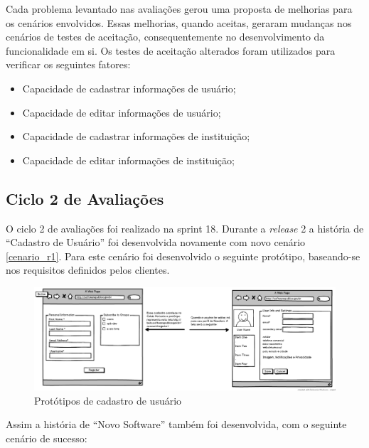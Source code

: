 Cada problema levantado nas avaliações gerou uma proposta de melhorias para os cenários envolvidos. Essas melhorias, quando aceitas, geraram mudanças nos cenários de testes de aceitação, consequentemente no desenvolvimento da funcionalidade em si. Os testes de aceitação alterados foram utilizados para verificar os seguintes fatores:

\begin{itemize}
	\item Capacidade de cadastrar informações de usuário;
	\item Capacidade de editar informações de usuário;
	\item Capacidade de cadastrar informações de instituição;
	\item Capacidade de editar informações de instituição;
\end{itemize}

\subsection{Ciclo 2 de Avaliações}

O ciclo 2 de avaliações foi realizado na sprint 18. Durante a \textit{release} 2 a história de ``Cadastro de Usuário'' foi desenvolvida novamente com novo cenário \ref{cenario_r1}. Para este cenário foi desenvolvido o seguinte protótipo, baseando-se nos requisitos definidos pelos clientes. 

	\begin{figure}[h!]
    	\centering
    	\includegraphics[keepaspectratio=true,scale=0.3]
      		{figuras/CadastroEdicaoUser.eps}
    	\caption{Protótipos de cadastro de usuário}
    	\label{cadastro user}
	\end{figure}

Assim a história de ``Novo Software'' também foi desenvolvida, com o seguinte cenário de sucesso:

